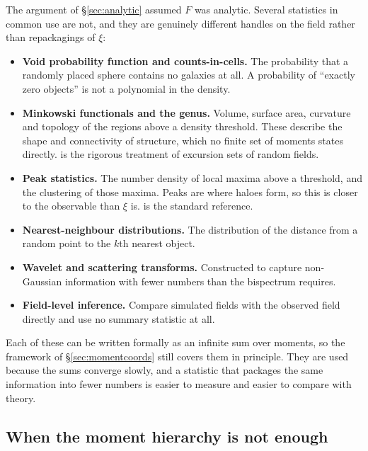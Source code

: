 \documentclass[12pt]{article}
\begin{document}
The argument of \S\ref{sec:analytic} assumed $F$ was analytic.  Several
statistics in common use are not, and they are genuinely different
handles on the field rather than repackagings of $\xi$:

\begin{itemize}
  \item \textbf{Void probability function and counts-in-cells.}  The
        probability that a randomly placed sphere contains no galaxies at
        all.  A probability of ``exactly zero objects'' is not a
        polynomial in the density.
  \item \textbf{Minkowski functionals and the genus.}  Volume, surface
        area, curvature and topology of the regions above a density
        threshold.  These describe the shape and connectivity of
        structure, which no finite set of moments states directly.
        \citet{AdlerTaylor2007} is the rigorous treatment of excursion
        sets of random fields.
  \item \textbf{Peak statistics.}  The number density of local maxima
        above a threshold, and the clustering of those maxima.  Peaks are
        where haloes form, so this is closer to the observable than
        $\xi$ is.  \citet{BBKS1986} is the standard reference.
  \item \textbf{Nearest-neighbour distributions.}  The distribution
        of the distance from a random point to the $k$th nearest
        object.
  \item \textbf{Wavelet and scattering transforms.}  Constructed to
        capture non-Gaussian information with fewer numbers than the
        bispectrum requires.
  \item \textbf{Field-level inference.}  Compare simulated fields with
        the observed field directly and use no summary statistic at all.
\end{itemize}

Each of these can be written formally as an infinite sum over moments,
so the framework of \S\ref{sec:momentcoords} still covers them in
principle.  They are used because the sums converge slowly, and a
statistic that packages the same information into fewer numbers is
easier to measure and easier to compare with theory.

\subsection{When the moment hierarchy is not enough}
\label{sec:momentproblem}
\end{document}
